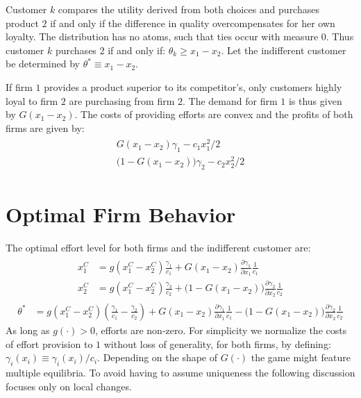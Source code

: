 \documentclass[a4paper, 11pt]{article}
\begin{document}
Customer $k$ compares the utility derived from both choices and purchases product $2$ if and only if the difference in quality overcompensates for her own loyalty. The distribution has no atoms, such that ties occur with measure $0$. Thus customer $k$ purchases $2$ if and only if: $\theta_k\geq x_1-x_2$. Let the indifferent customer be determined by $\theta^* \equiv x_1-x_2$.

If firm $1$ provides a product superior to its competitor's, only customers highly loyal to firm $2$ are purchasing from firm $2$. The demand for firm $1$ is thus given by $G(x_1-x_2)$. The costs of providing efforts are convex and the profits of both firms are given by:
\begin{align}
\begin{split}
	G(x_1-x_2)\gamma_1 - c_1x_1^2/2\\
	\big(1-G(x_1-x_2)\big)\gamma_2 - c_2x_2^2/2
\end{split}
\end{align}

\section{Optimal Firm Behavior}

The optimal effort level for both firms and the indifferent customer are:
\begin{align}
\begin{split}
x_1^C &= g(x_1^C-x_2^C)\frac{\gamma_1}{c_1} + G(x_1-x_2)\frac{\partial \gamma_1}{\partial x_1}\frac{1}{c_1}\\
x_2^C &= g(x_1^C-x_2^C)\frac{\gamma_2}{c_2} + \big(1-G(x_1-x_2)\big)\frac{\partial \gamma_2}{\partial x_2}\frac{1}{c_2}
\end{split}
\end{align}
\begin{align}
\theta^* &=  g(x_1^C-x_2^C)\left(\frac{\gamma_1}{c_1}-\frac{\gamma_2}{c_2}\right) + G(x_1-x_2)\frac{\partial \gamma_1}{\partial x_1}\frac{1}{c_1} - \big(1-G(x_1-x_2)\big)\frac{\partial \gamma_2}{\partial x_2}\frac{1}{c_2}
\end{align}
As long as $g(\cdot)>0$, efforts are non-zero. For simplicity we normalize the costs of effort provision to $1$ without loss of generality, for both firms, by defining: $\gamma_i(x_i)\equiv \gamma_i(x_i)/c_i$. Depending on the shape of $G(\cdot)$ the game might feature multiple equilibria. To avoid having to assume uniqueness the following discussion focuses only on local changes. 
\end{document}
